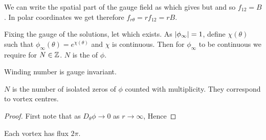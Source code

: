 \documentclass{article}
\begin{document}
\begin{lemma}
We can write the spatial part of the gauge field as 
which gives 
but 
and so $f_{12} = B$. In polar coordinates we get therefore $f_{r\theta} = r f_{12} = rB$. 
\end{lemma}

\begin{definition}
Fixing the gauge of the solutions, let 
which exists. As $\left\lvert \phi_\infty \right\rvert = 1$, define $\chi(\theta)$ such that $\phi_\infty(\theta) = e^{\chi(\theta)}$ and $\chi$ is continuous. Then for $\phi_\infty$ to be continuous we require 
for $N\in\mathbb{Z}$. $N$ is the  of $\phi$. 
\end{definition}

\begin{prop}
Winding number is gauge invariant. 
\end{prop}

\begin{prop}
$N$ is the number of isolated zeros of $\phi$ counted with multiplicity. They correspond to vortex centres. 
\end{prop}

\begin{prop}
\end{prop}
\begin{proof}
First note that as $D_\theta \phi \to 0$ as $r\to\infty$, 
Hence
\end{proof}
\begin{corollary}
Each vortex has flux $2\pi$. 
\end{corollary}
\end{document}
